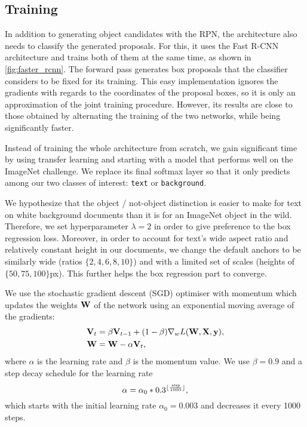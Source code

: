 	\subsection{Training}\label{sec:frcnn_train}
		In addition to generating object candidates with the RPN, the \FRCNN{} architecture also needs to classify the generated proposals. For this, it uses the Fast R-CNN architecture and trains both of them at the same time, as shown in \autoref{fig:faster_rcnn}. The forward pass generates box proposals that the classifier considers to be fixed for its training. This easy implementation ignores the gradients with regards to the coordinates of the proposal boxes, so it is only an approximation of the joint training procedure. However, its results are close to those obtained by alternating the training of the two networks, while being significantly faster.

		Instead of training the whole architecture from scratch, we gain significant time by using transfer learning and starting with a model that performs well on the ImageNet challenge. We replace its final softmax layer so that it only predicts among our two classes of interest: \texttt{text} or \texttt{background}.

		We hypothesize that the object / not-object distinction is easier to make for text on white background documents than it is for an ImageNet object in the wild. Therefore, we set hyperparameter \(\lambda = 2\) in order to give preference to the box regression loss. Moreover, in order to account for text's wide aspect ratio and relatively constant height in our documents, we change the default anchors to be similarly wide (ratios \(\{2, 4, 6, 8, 10\}\)) and with a limited set of scales (heights of \(\{50, 75, 100\}\)px). This further helps the box regression part to converge.

		We use the stochastic gradient descent (SGD) optimiser with momentum which updates the weights \(\mathbf{W}\) of the network using an exponential moving average of the gradients:\[
		\begin{split}
			\mathbf{V}_t &= \beta \mathbf{V}_{t-1} + (1-\beta) \nabla_w L (\mathbf{W}, \mathbf{X}, \mathbf{y}),\\
			\mathbf{W} &= \mathbf{W} - \alpha \mathbf{V}_t,
		\end{split}
		\]
		where \(\alpha\) is the learning rate and \(\beta\) is the momentum value. We use \(\beta = 0.9\) and a step decay schedule for the learning rate \[
			\alpha = \alpha_0 * 0.3 ^ {\lfloor\frac{\mathit{step}}{1000}\rfloor},
		\]
		which starts with the initial learning rate \(\alpha_0 = 0.003\) and decreases it every 1000 steps.

